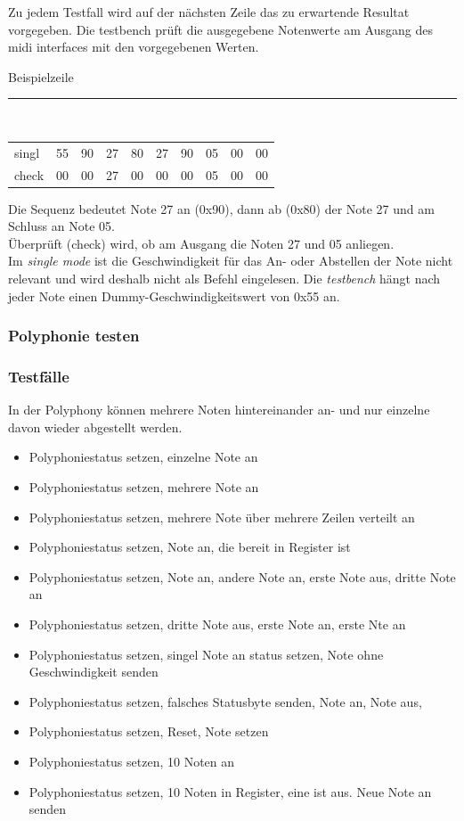 Zu jedem Testfall wird auf der nächsten Zeile das zu erwartende Resultat vorgegeben. Die testbench prüft die ausgegebene Notenwerte am Ausgang des midi interfaces mit den vorgegebenen Werten.

Beispielzeile\\
\rule{\textwidth}{0.4pt}\\
{
\renewcommand{\arraystretch}{1.0} %
\begin{tabular*}{\textwidth}{@{}@{\extracolsep{\fill}}*{10}{l}@{}} %
singl & 55 & 90 & 27 & 80 & 27 & 90 & 05 & 00 & 00\\
check & 00 & 00 & 27 & 00 & 00 & 00 & 05 & 00 & 00\\
\end{tabular*}
}

Die Sequenz bedeutet Note 27 an (0x90), dann ab (0x80) der Note 27 und am Schluss an Note 05. \\
Überprüft (check) wird, ob am Ausgang die Noten 27 und 05 anliegen.\\
Im \textit{single mode} ist die Geschwindigkeit für das An- oder Abstellen der Note nicht relevant und wird deshalb nicht als Befehl eingelesen. Die \textit{testbench} hängt nach jeder Note einen Dummy-Geschwindigkeitswert von 0x55 an.

\subsubsection{Polyphonie testen }\label{polyphonitest}

\subsubsection{Testfälle}

In der Polyphony können mehrere Noten hintereinander an- und nur einzelne davon wieder abgestellt werden.

\begin{itemize}
\item Polyphoniestatus setzen, einzelne Note an
\item Polyphoniestatus setzen, mehrere Note an
\item Polyphoniestatus setzen, mehrere Note über mehrere Zeilen verteilt an
\item Polyphoniestatus setzen, Note an, die bereit in Register ist
\item Polyphoniestatus setzen, Note an, andere Note an, erste Note aus, dritte Note an
\item Polyphoniestatus setzen, dritte Note aus, erste Note an, erste Nte an
\item Polyphoniestatus setzen, singel Note an status setzen, Note ohne Geschwindigkeit senden
\item Polyphoniestatus setzen, falsches Statusbyte senden, Note an, Note aus,
\item Polyphoniestatus setzen, Reset, Note setzen
\item Polyphoniestatus setzen, 10 Noten an
\item Polyphoniestatus setzen, 10 Noten in Register, eine ist aus. Neue Note an senden
\end{itemize}


